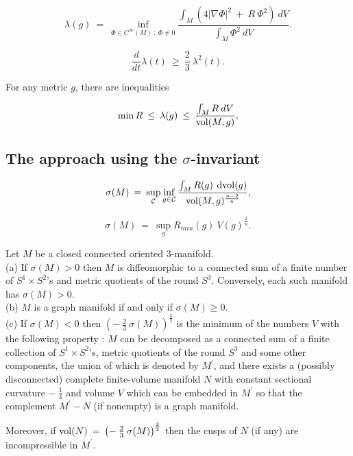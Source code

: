 \begin{equation} \label{Rayleigh}
\lambda(g) \: = \: \inf_{\Phi \in C^\infty(M) \: : \:
\Phi \neq 0} \frac{\int_M \left( 4 |\nabla \Phi|^2 \: + \:
R \: \Phi^2 \right) \: dV}{\int_M \Phi^2 \: dV}.
\end{equation}

\begin{equation} \label{ll}
\frac{d}{dt} \lambda(t) \: \ge \: \frac23 \:
\lambda^2(t).
\end{equation}

For any metric $g$, there are inequalities

\begin{equation} \label{test}
\min R \: \le \: \lambda(g) \: \le \: \frac{\int_M R \: dV}{\operatorname{vol}(M, g)},
\end{equation}

\subsection{The approach using the $\sigma$-invariant}

\begin{equation} \label{yamabe}
\sigma(M) \: = \: \sup_{{\mathcal C}} \inf_{g \in {\mathcal C}}
\frac{\int_M R(g) \: \operatorname{dvol}(g)}{\operatorname{vol}(M, g)^{\frac{n-2}{n}}},
\end{equation}

\begin{equation} \label{testt}
\sigma(M) \: = \: \sup_{g} R_{min}(g) \: V(g)^{\frac2n}.
\end{equation}

\begin{proposition}
  \label{prop:kl-alternative-proof-cusp-incompressibility-characterization-graph-manifolds}
 \label{propYamabe}
Let $M$ be a closed connected oriented $3$-manifold. \\
(a) If $\sigma(M) > 0$ then $M$ is
diffeomorphic to a connected sum of a finite number of
$S^1 \times S^2$'s and metric quotients of the round $S^3$.
Conversely, each such manifold has $\sigma(M) > 0$. \\
(b) $M$ is a graph manifold if and only if $\sigma(M)
\ge 0$. \\
(c) If $\sigma(M) < 0$
 then
$\left( - \: \frac23 \: \sigma(M)
\right)^{\frac32}$ is the minimum
of the numbers
$V$ with the following property : $M$ can be decomposed as a connected sum
of a finite collection of $S^1 \times S^2$'s, metric quotients of the round
$S^3$ and some other components, the union of which is denoted by
$M^\prime$, and there exists a (possibly disconnected) complete
finite-volume
manifold $N$ with constant sectional curvature $- \: \frac14$ and
volume $V$ which can be embedded in $M^\prime$ so that the
complement $M^\prime - N$ (if nonempty) is a graph manifold.

Moreover, if
$\operatorname{vol}(N) \: = \: \left( - \: \frac23 \: \sigma(M)
\right)^{\frac32}$
then the
cusps of $N$ (if any) are incompressible in $M^\prime$.
\end{proposition}

